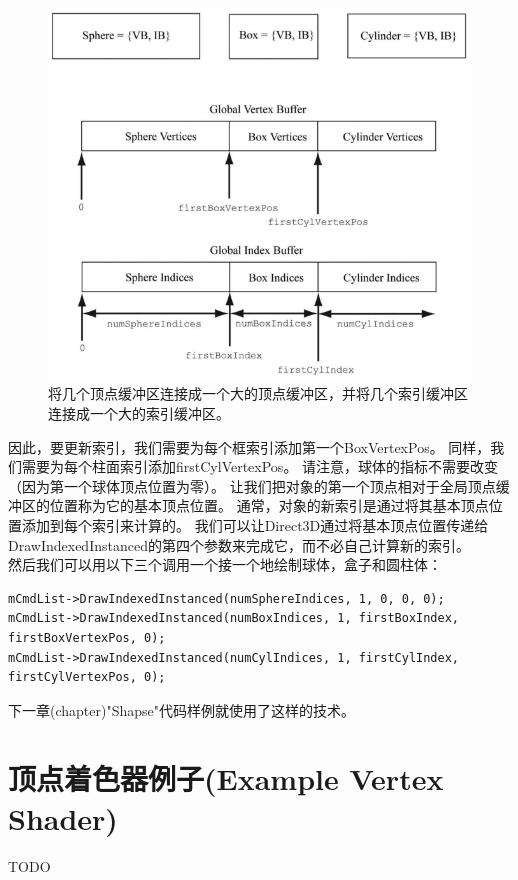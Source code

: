\documentclass[11pt,a4paper,oldfontcommands]{memoir}
\begin{document}
{\begin{flushleft}
\begin{figure}[h]
    \includegraphics[width=\textwidth]{6-3}
    \centering
    \caption{将几个顶点缓冲区连接成一个大的顶点缓冲区，并将几个索引缓冲区连接成一个大的索引缓冲区。}
    \label{fig:6-3}
\end{figure}

因此，要更新索引，我们需要为每个框索引添加第一个BoxVertexPos。 同样，我们需要为每个柱面索引添加firstCylVertexPos。 请注意，球体的指标不需要改变（因为第一个球体顶点位置为零）。 让我们把对象的第一个顶点相对于全局顶点缓冲区的位置称为它的基本顶点位置。 通常，对象的新索引是通过将其基本顶点位置添加到每个索引来计算的。 我们可以让Direct3D通过将基本顶点位置传递给DrawIndexedInstanced的第四个参数来完成它，而不必自己计算新的索引。\\
然后我们可以用以下三个调用一个接一个地绘制球体，盒子和圆柱体：\\
\begin{lstlisting}
mCmdList->DrawIndexedInstanced(numSphereIndices, 1, 0, 0, 0);
mCmdList->DrawIndexedInstanced(numBoxIndices, 1, firstBoxIndex, firstBoxVertexPos, 0);
mCmdList->DrawIndexedInstanced(numCylIndices, 1, firstCylIndex, firstCylVertexPos, 0);
\end{lstlisting}
下一章(chapter)"Shapse"代码样例就使用了这样的技术。
\end{flushleft}
\section{顶点着色器例子(Example Vertex Shader)}
TODO
}
\end{document}
